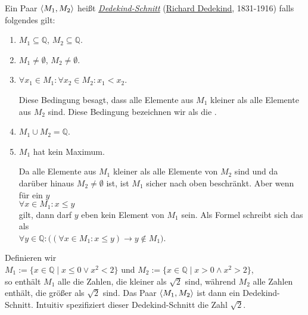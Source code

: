 \begin{Definition} \lb
Ein Paar $\pair(M_1,M_2)$ heißt \href{http://de.wikipedia.org/wiki/Dedekindscher_Schnitt}{\emph{Dedekind-Schnitt}}
(\href{http://de.wikipedia.org/wiki/Richard_Dedekind}{\textrm{Richard Dedekind}}, 1831-1916)
falls folgendes gilt:
\begin{enumerate}
\item $M_1 \subseteq  \mathbb{Q}$, \quad $M_2 \subseteq \mathbb{Q}$.
\item $M_1 \not= \emptyset$, \quad $M_2 \not= \emptyset$.
\item $\forall x_1 \in M_1: \forall x_2 \in M_2: x_1 < x_2$.

       Diese Bedingung besagt, dass alle Elemente aus $M_1$ kleiner als alle Elemente aus $M_2$
       sind.  Diese Bedingung bezeichnen wir als die .
\item $M_1 \cup M_2 = \mathbb{Q}$.
\item $M_1$ hat kein Maximum.

      Da alle Elemente aus $M_1$ kleiner als alle Elemente von $M_2$ sind und da darüber hinaus 
      $M_2 \not= \emptyset$ ist, ist $M_1$ sicher nach oben beschränkt.  Aber wenn für ein $y$
      \\[0.2cm]
      \hspace*{1.3cm}
      $\forall x \in M_1: x \leq y$
      \\[0.2cm]
      gilt, dann darf $y$ eben kein Element von $M_1$ sein.  Als Formel schreibt sich das als
      \\[0.2cm]
      \hspace*{1.3cm}
      $\forall y \in \mathbb{Q}: \bigl((\forall x \in M_1: x \leq y) \rightarrow y \not\in M_1\bigr)$. \edx
\end{enumerate}
\end{Definition}

\example 
Definieren wir
\\[0.2cm]
\hspace*{1.3cm} 
$M_1 := \{ x \in \mathbb{Q} \mid x \leq 0 \vee x^2 < 2 \}$ \quad und \quad
$M_2 := \{ x \in \mathbb{Q} \mid x > 0 \wedge x^2 > 2 \}$,
\\[0.2cm]
so enthält $M_1$ alle die Zahlen, die kleiner als $\sqrt{2}$ sind, während
$M_2$ alle Zahlen enthält, die größer als $\sqrt{2}$ sind. Das Paar $\pair(M_1,M_2)$ ist dann ein
Dedekind-Schnitt.  Intuitiv spezifiziert dieser Dedekind-Schnitt die Zahl $\sqrt{2}$.
\eox



